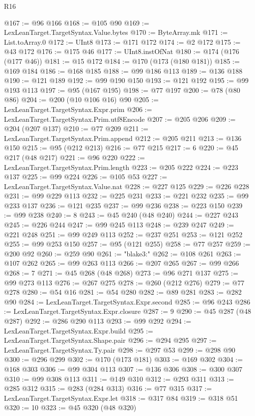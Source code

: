 \begin{lexlean}{R16}
\begin{coremodule}
@167 := @96 @166
@168 := @105 @90
@169 := LexLeanTarget.TargetSyntax.Value.bytes
@170 := ByteArray.mk
@171 := List.toArray.{0}
@172 := UInt8
@173 := @171 @172
@174 := @2 @172
@175 := @43 @172
@176 := @175 @46
@177 := UInt8.instOfNat
@180 := @174 (@176 (@177 @46))
@181 := @15 @172
@184 := @170 (@173 (@180 @181))
@185 := @169 @184
@186 := @168 @185
@188 := @99 @186 @113
@189 := @136 @188
@190 := @121 @189
@192 := @99 @190 @150
@193 := @121 @192
@195 := @99 @193 @113
@197 := @95 (@167 @195)
@198 := @77 @197
@200 := @78 (@80 @86)
@204 := @200 (@10 @106 @16) @90
@205 := LexLeanTarget.TargetSyntax.Expr.prim
@206 := LexLeanTarget.TargetSyntax.Prim.utf8Encode
@207 := @205 @206
@209 := @204 (@207 @137)
@210 := @77 @209
@211 := LexLeanTarget.TargetSyntax.Prim.append
@212 := @205 @211
@213 := @136 @150
@215 := @95 (@212 @213)
@216 := @77 @215
@217 := 6
@220 := @45 @217 (@48 @217)
@221 := @96 @220
@222 := LexLeanTarget.TargetSyntax.Prim.length
@223 := @205 @222
@224 := @223 @137
@225 := @99 @224
@226 := @105 @53
@227 := LexLeanTarget.TargetSyntax.Value.nat
@228 := @227 @125
@229 := @226 @228
@231 := @99 @229 @113
@232 := @225 @231
@233 := @221 @232
@235 := @99 @233 @137
@236 := @121 @235
@237 := @99 @236
@238 := @223 @150
@239 := @99 @238
@240 := 8
@243 := @45 @240 (@48 @240)
@244 := @227 @243
@245 := @226 @244
@247 := @99 @245 @113
@248 := @239 @247
@249 := @221 @248
@251 := @99 @249 @113
@252 := @237 @251
@253 := @121 @252
@255 := @99 @253 @150
@257 := @95 (@121 @255)
@258 := @77 @257
@259 := @200 @92
@260 := @259 @90
@261 := "blake3:"
@262 := @108 @261
@263 := @107 @262
@265 := @99 @263 @113
@266 := @207 @265
@267 := @99 @266
@268 := 7
@271 := @45 @268 (@48 @268)
@273 := @96 @271 @137
@275 := @99 @273 @113
@276 := @267 @275
@278 := @260 (@212 @276)
@279 := @77 @278
@280 := @54 @16
@281 := @54 @280
@282 := @89 @281
@283 := @282 @90
@284 := LexLeanTarget.TargetSyntax.Expr.second
@285 := @96 @243
@286 := LexLeanTarget.TargetSyntax.Expr.closure
@287 := 9
@290 := @45 @287 (@48 @287)
@292 := @286 @290 @113
@293 := @99 @292
@294 := LexLeanTarget.TargetSyntax.Expr.build
@295 := LexLeanTarget.TargetSyntax.Shape.pair
@296 := @294 @295
@297 := LexLeanTarget.TargetSyntax.Ty.pair
@298 := @297 @53
@299 := @298 @90
@300 := @296 @299
@302 := @170 (@173 @181)
@303 := @169 @302
@304 := @168 @303
@306 := @99 @304 @113
@307 := @136 @306
@308 := @300 @307
@310 := @99 @308 @113
@311 := @149 @310
@312 := @293 @311
@313 := @285 @312
@315 := @283 (@284 @313)
@316 := @77 @315
@317 := LexLeanTarget.TargetSyntax.Expr.let
@318 := @317 @84
@319 := @318 @51
@320 := 10
@323 := @45 @320 (@48 @320)

\end{coremodule}
\end{lexlean}
